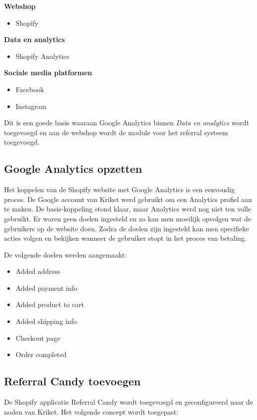 \textbf{Webshop}
\begin{itemize}
	\item Shopify
\end{itemize}

\textbf{Data en analytics}
\begin{itemize}
	\item Shopify Analytics
\end{itemize}

\textbf{Sociale media platformen}
\begin{itemize}
	\item Facebook
	\item Instagram
\end{itemize}

Dit is een goede basis waaraan Google Analytics binnen \emph{Data en analytics} wordt toegevoegd en aan de webshop wordt de module voor het referral systeem toegevoegd.

\subsection{Google Analytics opzetten} \label{sec:google-analytics-opzetten}
Het koppelen van de Shopify website met Google Analytics is een eenvoudig proces. De Google account van Kriket werd gebruikt om een Analytics profiel aan te maken. De basis-koppeling stond klaar, maar Analytics werd nog niet ten volle gebruikt. Er waren geen doelen ingesteld en zo kan men moeilijk opvolgen wat de gebruikers op de website doen. Zodra de doelen zijn ingesteld kan men specifieke acties volgen en bekijken wanneer de gebruiker stopt in het proces van betaling.

De volgende doelen werden aangemaakt:
\begin{itemize}
	\item Added address
	\item Added payment info
	\item Added product to cart
	\item Added shipping info
	\item Checkout page
	\item Order completed
\end{itemize}

\subsection{Referral Candy toevoegen} \label{sec:referral-candy-toevoegen}
De Shopify applicatie Referral Candy wordt toegevoegd en geconfigureerd naar de noden van Kriket. Het volgende concept wordt toegepast:

